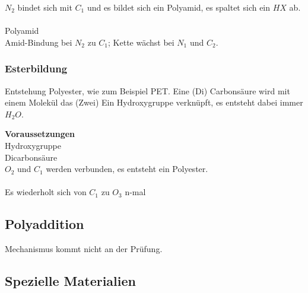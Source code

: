 
$N_2$ bindet sich mit $C_1$ und es bildet sich ein Polyamid, es spaltet sich ein $HX$ ab.\\

\\

Polyamid\\

Amid-Bindung bei $N_2$ zu $C_1$; Kette wächst bei $N_1$ und $C_2$.

\subsubsection{Esterbildung}

Entstehung Polyester, wie zum Beispiel PET. Eine (Di) Carbonsäure wird mit einem Molekül das (Zwei) Ein Hydroxygruppe verknüpft, es entsteht dabei immer $H_2O$.

\textbf{Voraussetzungen}\\


 Hydroxygruppe\\


 Dicarbonsäure\\

$O_2$ und $C_1$ werden verbunden, es entsteht ein Polyester.\\

\\

Es wiederholt sich von $C_1$ zu $O_3$ n-mal

\subsection{Polyaddition}

Mechanismus kommt nicht an der Prüfung.

\subsection{Spezielle Materialien}


